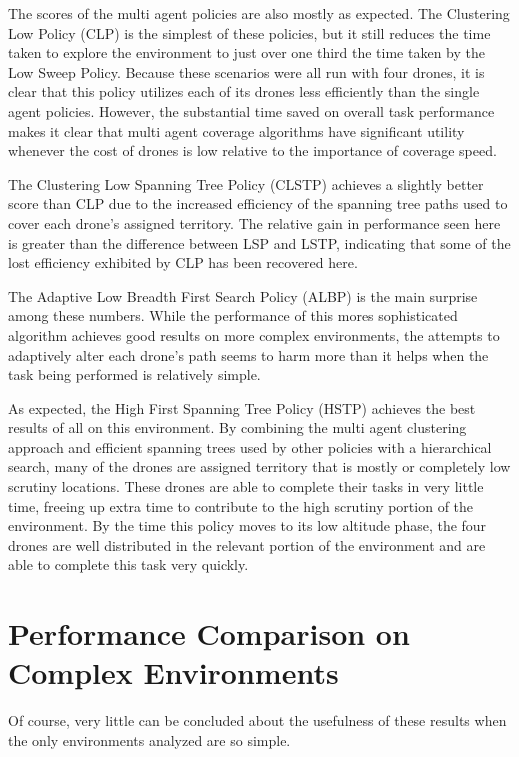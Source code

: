 The scores of the multi agent policies are also mostly as expected. The Clustering Low Policy (CLP) is the simplest of these policies, but it still reduces the time taken to explore the environment to just over one third the time taken by the Low Sweep Policy. Because these scenarios were all run with four drones, it is clear that this policy utilizes each of its drones less efficiently than the single agent policies. However, the substantial time saved on overall task performance makes it clear that multi agent coverage algorithms have significant utility whenever the cost of drones is low relative to the importance of coverage speed.

The Clustering Low Spanning Tree Policy (CLSTP) achieves a slightly better score than CLP due to the increased efficiency of the spanning tree paths used to cover each drone's assigned territory. The relative gain in performance seen here is greater than the difference between LSP and LSTP, indicating that some of the lost efficiency exhibited by CLP has been recovered here. 

The Adaptive Low Breadth First Search Policy (ALBP) is the main surprise among these numbers. While the performance of this mores sophisticated algorithm achieves good results on more complex environments, the attempts to adaptively alter each drone's path seems to harm more than it helps when the task being performed is relatively simple.

As expected, the High First Spanning Tree Policy (HSTP) achieves the best results of all on this environment. By combining the multi agent clustering approach and efficient spanning trees used by other policies with a hierarchical search, many of the drones are assigned territory that is mostly or completely low scrutiny locations. These drones are able to complete their tasks in very little time, freeing up extra time to contribute to the high scrutiny portion of the environment. By the time this policy moves to its low altitude phase, the four drones are well distributed in the relevant portion of the environment and are able to complete this task very quickly.

\section{Performance Comparison on Complex Environments}

Of course, very little can be concluded about the usefulness of these results when the only environments analyzed are so simple.

